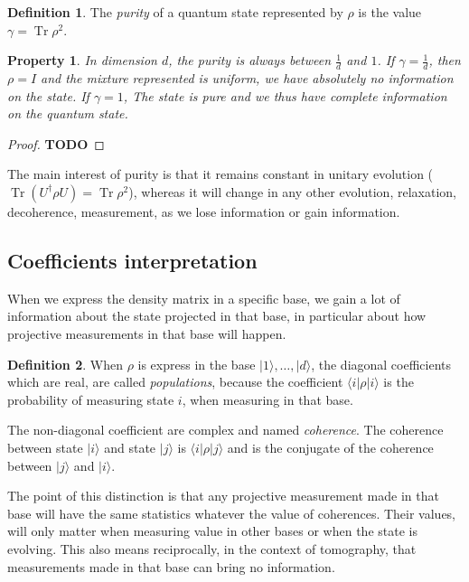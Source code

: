 \documentclass[10pt]{report}
\theoremstyle{plain}
\newtheorem{prop}[thm]{Property}
\theoremstyle{definition}
\newtheorem{defn}{Definition}[chapter]
\theoremstyle{remark}
\newcommand{\TODO}{\textbf{TODO}}
\newcommand{\ket}[1]{|#1\rangle}
\newcommand{\bra}[1]{\langle#1|}
\DeclareMathOperator{\Tr}{Tr}
\begin{document}
\begin{defn}
  The \emph{purity} of a quantum state represented by $\rho$ is the value $\gamma = \Tr \rho^2$.
\end{defn}

\begin{prop}
  In dimension $d$, the purity is always between $\frac1d$ and $1$. If $\gamma =
  \frac1d$, then $\rho = I$ and the mixture represented is uniform, we have
  absolutely no information on the state. If $\gamma = 1$, The state is pure and
  we thus have complete information on the quantum state.
\end{prop}

\begin{proof}
   \TODO
\end{proof}

The main interest of purity is that it remains constant in unitary evolution
($\Tr (U^\dagger \rho U) = \Tr \rho^2$),
whereas it will change in any other evolution, relaxation, decoherence,
measurement, as we lose information or gain information.

\subsection{Coefficients interpretation}

When we express the density matrix in a specific base, we gain a lot of
information about the state projected in that base, in particular about how
projective measurements in that base will happen.

\begin{defn}
  When $\rho$ is express in the base $\ket 1, \ldots, \ket d$, the diagonal
  coefficients which are real, are called \emph{populations}, because the
  coefficient $\bra i \rho \ket i$ is the probability of measuring state $i$,
  when measuring in that base.

  The non-diagonal coefficient are complex and named \emph{coherence}. The
  coherence between state $\ket i$ and state $\ket j$ is $\bra i \rho \ket j$
  and is the conjugate of the coherence between $\ket j$ and $\ket i$.
\end{defn}

The point of this distinction is that any projective measurement made in that
base will have the same statistics whatever the value of coherences. Their
values, will only matter when measuring value in other bases or when the state
is evolving. This also means reciprocally, in the context of tomography,
that measurements made in that base can bring no information.
\end{document}
